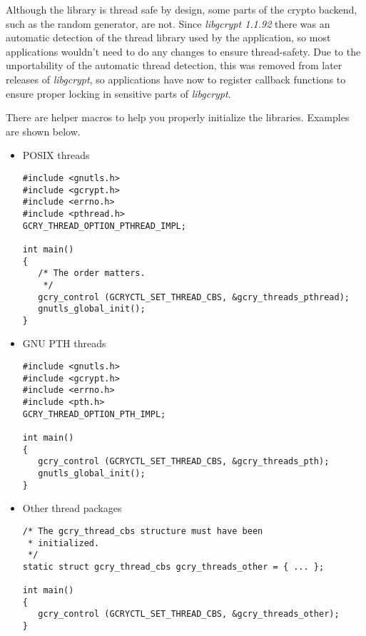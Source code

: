 Although the \gnutls{} library is thread safe by design, some parts of the crypto
backend, such as the random generator, are not. Since \emph{libgcrypt 1.1.92}
there was an automatic detection of the thread library used by the
application, so most applications wouldn't need to do any changes to
ensure thread-safety. Due to the unportability of the automatic thread
detection, this was removed from later releases of \emph{libgcrypt}, so
applications have now to register callback functions to ensure proper locking
in sensitive parts of \emph{libgcrypt}. 
\par
There are helper macros to help you properly initialize the libraries.
Examples are shown below.
\begin{itemize}

\item POSIX threads
\begin{verbatim}
#include <gnutls.h>
#include <gcrypt.h>
#include <errno.h>
#include <pthread.h>
GCRY_THREAD_OPTION_PTHREAD_IMPL;

int main() 
{
   /* The order matters.
    */
   gcry_control (GCRYCTL_SET_THREAD_CBS, &gcry_threads_pthread);
   gnutls_global_init();
}
\end{verbatim}

\item GNU PTH threads
\begin{verbatim}
#include <gnutls.h>
#include <gcrypt.h>
#include <errno.h>
#include <pth.h>
GCRY_THREAD_OPTION_PTH_IMPL;

int main() 
{
   gcry_control (GCRYCTL_SET_THREAD_CBS, &gcry_threads_pth);
   gnutls_global_init();
}
\end{verbatim}

\item Other thread packages
\begin{verbatim}
/* The gcry_thread_cbs structure must have been
 * initialized.
 */
static struct gcry_thread_cbs gcry_threads_other = { ... };

int main()
{
   gcry_control (GCRYCTL_SET_THREAD_CBS, &gcry_threads_other);
}
\end{verbatim}
\end{itemize}

